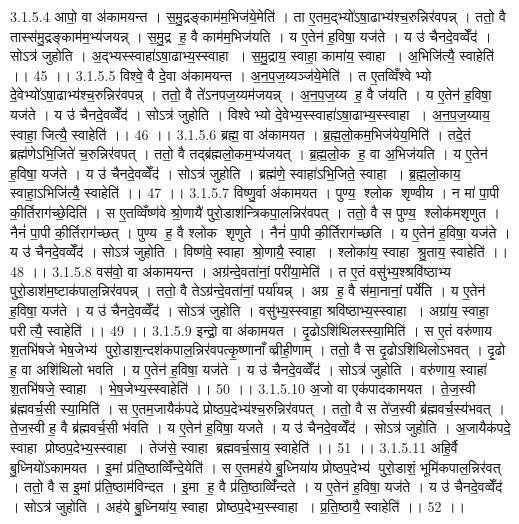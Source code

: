 3.1.5.4
आपो॒ वा अ॑कामयन्त । स॒मु॒द्रङ्काम॑म॒भिज॑ये॒मेति॑ । ता ए॒तम॒द्भ्यो॑ऽषा॒ढाभ्य॑श्च॒रुन्निर॑वपन्न् । ततो॒ वै तास्स॑मु॒द्रङ्काम॑म॒भ्य॑जयन्न् । स॒मु॒द्र ह॒ वै काम॑म॒भिज॑यति । य ए॒तेन॑ ह॒विषा॒ यज॑ते । य उ॑ चैनदे॒वव्वेँद॑ । सोऽत्र॑ जुहोति । अ॒द्भ्यस्स्वाहा॑ऽषा॒ढाभ्य॒स्स्वाहा । स॒मु॒द्राय॒ स्वाहा॒ कामा॑य॒ स्वाहा । अ॒भिजि॑त्यै॒ स्वाहेति॑ ।। 45 ।।
3.1.5.5
विश्वे॒ वै दे॒वा अ॑कामयन्त । अ॒न॒प॒ज॒य्यञ्ज॑ये॒मेति॑ । त ए॒तव्विँश्वेभ्यो दे॒वेभ्यो॑ऽषा॒ढाभ्य॑श्च॒रुन्निर॑वपन्न् । ततो॒ वै ते॑ऽनपज॒य्यम॑जयन्न् । अ॒न॒प॒ज॒य्य ह॒ वै ज॑यति । य ए॒तेन॑ ह॒विषा॒ यज॑ते । य उ॑ चैनदे॒वव्वेँद॑ । सोऽत्र॑ जुहोति । विश्वेभ्यो दे॒वेभ्य॒स्स्वाहा॑ऽषा॒ढाभ्य॒स्स्वाहा । अ॒न॒प॒ज॒य्याय॒ स्वाहा॒ जित्यै॒ स्वाहेति॑ ।। 46 ।।
3.1.5.6
ब्रह्म॒ वा अ॑कामयत । ब्र॒ह्म॒लो॒कम॒भिज॑येय॒मिति॑ । तदे॒तं ब्रह्म॑णेऽभि॒जिते॑ च॒रुन्निर॑वपत् । ततो॒ वै तद्ब्र॑ह्मलो॒कम॒भ्य॑जयत् । ब्र॒ह्म॒लो॒क ह॒ वा अ॒भिज॑यति । य ए॒तेन॑ ह॒विषा॒ यज॑ते । य उ॑ चैनदे॒वव्वेँद॑ । सोऽत्र॑ जुहोति । ब्रह्म॑णे॒ स्वाहा॑ऽभि॒जिते॒ स्वाहा । ब्र॒ह्म॒लो॒काय॒ स्वाहा॒ऽभिजि॑त्यै॒ स्वाहेति॑ ।। 47 ।।
3.1.5.7
विष्णु॒र्वा अ॑कामयत । पुण्य॒ श्लोक॑ शृण्वीय । न मा॑ पा॒पी की॒र्तिराग॑च्छे॒दिति॑ । स ए॒तव्विँष्ण॑वे श्रो॒णायै॑ पुरो॒डाश॑न्त्रिकपा॒लन्निर॑वपत् । ततो॒ वै स पुण्य॒॒ श्लोक॑मशृणुत । नैनं॑ पा॒पी की॒र्तिराग॑च्छत् । पुण्य॑ ह॒ वै श्लोक॑ शृणुते । नैनं॑ पा॒पी की॒र्तिराग॑च्छति । य ए॒तेन॑ ह॒विषा॒ यज॑ते । य उ॑ चैनदे॒वव्वेँद॑ । सोऽत्र॑ जुहोति । विष्ण॑वे॒ स्वाहा श्रो॒णायै॒ स्वाहा । श्लोका॑य॒ स्वाहा श्रु॒ताय॒ स्वाहेति॑ ।। 48 ।।
3.1.5.8
वस॑वो॒ वा अ॑कामयन्त । अग्र॑न्दे॒वता॑नां॒ परी॑या॒मेति॑ । त ए॒तं वसु॑भ्य॒श्श्रवि॑ष्ठाभ्य पुरो॒डाश॑म॒ष्टाक॑पाल॒न्निर॑वपन्न् । ततो॒ वै तेऽग्र॑न्दे॒वता॑नां॒ पर्या॑यन्न् । अग्र॑ ह॒ वै स॑मा॒नानां॒ पर्ये॑ति । य ए॒तेन॑ ह॒विषा॒ यज॑ते । य उ॑ चैनदे॒वव्वेँद॑ । सोऽत्र॑ जुहोति । वसु॑भ्य॒स्स्वाहा॒ श्रवि॑ष्ठाभ्य॒स्स्वाहा । अग्रा॑य॒ स्वाहा॒ परीत्यै॒ स्वाहेति॑ ।। 49 ।।
3.1.5.9
इन्द्रो॒ वा अ॑कामयत । दृ॒ढोऽशि॑थिलस्स्या॒मिति॑ । स ए॒तं वरु॑णाय श॒तभि॑षजे भेष॒जेभ्य॑ पुरो॒डाश॒न्दश॑कपाल॒न्निर॑वपत्कृ॒ष्णानाँव्व्रीही॒णाम् । ततो॒ वै स दृ॒ढोऽशि॑थिलोऽभवत् । दृ॒ढो ह॒ वा अशि॑थिलो भवति । य ए॒तेन॑ ह॒विषा॒ यज॑ते । य उ॑ चैनदे॒वव्वेँद॑ । सोऽत्र॑ जुहोति । वरु॑णाय॒ स्वाहा॑ श॒तभि॑षजे॒ स्वाहा । भे॒ष॒जेभ्य॒स्स्वाहेति॑ ।। 50 ।।
3.1.5.10
अ॒जो वा एक॑पादकामयत । ते॒ज॒स्वी ब्र॑ह्मवर्च॒सी स्या॒मिति॑ । स ए॒तम॒जायैक॑पदे प्रोष्ठप॒देभ्य॑श्च॒रुन्निर॑वपत् । ततो॒ वै स ते॑ज॒स्वी ब्र॑ह्मवर्च॒स्य॑भवत् । ते॒ज॒स्वी ह॒ वै ब्र॑ह्मवर्च॒सी भ॑वति । य ए॒तेन॑ ह॒विषा॒ यजते । य उ॑ चैनदे॒वव्वेँद॑ । सोऽत्र॑ जुहोति । अ॒जायैक॑पदे॒ स्वाहा प्रोष्ठप॒देभ्य॒स्स्वाहा । तेज॑से॒ स्वाहा ब्रह्मवर्च॒साय॒ स्वाहेति॑ ।। 51 ।।
3.1.5.11
अहि॒र्वै बु॒ध्नियो॑ऽकामयत । इ॒मां प्र॑ति॒ष्ठाव्विँ॑न्दे॒येति॑ । स ए॒तमह॑ये बु॒ध्निया॑य प्रोष्ठप॒देभ्य॑ पुरो॒डाशं॒ भूमि॑कपाल॒न्निर॑वत् । ततो॒ वै स इ॒मां प्र॑ति॒ष्ठाम॑विन्दत । इ॒मा ह॒ वै प्र॑ति॒ष्ठाव्विँ॑न्दते । य ए॒तेन॑ ह॒विषा॒ यज॑ते । य उ॑ चैनदे॒वव्वेँद॑ । सोऽत्र॑ जुहोति । अह॑ये बु॒ध्निया॑य॒ स्वाहा प्रोष्ठप॒देभ्य॒स्स्वाहा । प्र॒ति॒ष्ठायै॒ स्वाहेति॑ ।। 52 ।।
